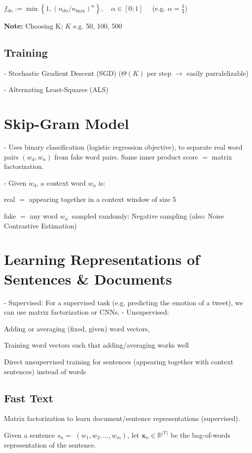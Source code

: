 $f_{d n}:=\min \left\{1,\left(n_{d n} / n_{\max }\right)^{\alpha}\right\}, \quad \alpha \in[0 ; 1] \quad$ (e.g. $\alpha=\frac{3}{4}$)

\textbf{Note:} Choosing K; $K$ e.g. 50, 100, 500

\subsection*{Training}
- Stochastic Gradient Descent (SGD) ($\Theta(K)$ per step $\rightarrow$ easily parralelizable)

- Alternating Least-Squares (ALS)

\section*{Skip-Gram Model}
- Uses binary classification (logistic regression objective), to separate real word pairs $\left(w_{d}, w_{n}\right)$ from fake word pairs. Same inner product score $=$ matrix factorization.

- Given $w_{d}$, a context word $w_{n}$ is:

real $=$ appearing together in a context window of size 5

fake $=$ any word $w_{n^{\prime}}$ sampled randomly: Negative sampling (also: Noise Contrastive Estimation)

\section*{Learning Representations of Sentences \& Documents}
- Supervised: For a supervised task (e.g. predicting the emotion of a tweet), we can use matrix factorization or CNNs.
- Unsupervised: 

Adding or averaging (fixed, given) word vectors, 

Training word vectors such that adding/averaging works well

Direct unsupervised training for sentences (appearing together with context sentences) instead of words

\subsection*{Fast Text}
Matrix factorization to learn document/sentence representations (supervised).

Given a sentence $s_{n}=$ $\left(w_{1}, w_{2}, \ldots, w_{m}\right)$, let $\mathbf{x}_{n} \in \mathbb{R}^{|\mathcal{V}|}$ be the bag-of-words representation of the sentence.

